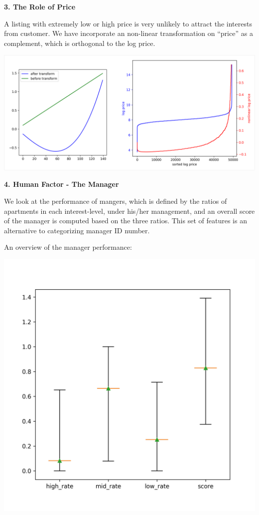 \documentclass[landscape,final,a0paper,fontscale=0.285]{baposter}
\begin{document}
\begin{poster}
{\begin{multicols}{2}
  \noindent\textbf{3. The Role of Price}\vspace{0.2em}

  A listing with extremely low or high price is very unlikely to attract the interests from customer. We have incorporate an non-linear transformation on ``price'' as a complement, which is orthogonal to the log price.
  
  {\centering\includegraphics[width=0.85\linewidth]{images/nonlinear.png}\\}
  \vspace{0.2em}
 
\noindent\textbf{4. Human Factor - The Manager}\vspace{-0.5em}
  
  \begin{multicols}{2}
    We look at the performance of mangers, which is defined by the ratios of apartments in each interest-level, under his/her management, and an overall score of the manager is computed based on the three ratios. This set of features is an alternative to categorizing manager ID number.
    
    \noindent An overview of the manager performance:
    
    {\centering\includegraphics[width=0.95\linewidth]{images/manager_skill.png}}
    

\end{multicols}
\end{multicols}}
\end{poster}
\end{document}
